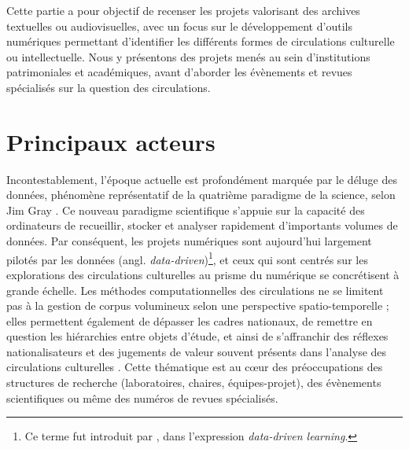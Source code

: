 \label{sect:sota_circulations}
Cette partie a pour objectif de recenser les projets valorisant des archives textuelles ou audiovisuelles,  avec un focus sur le développement d'outils numériques permettant d'identifier les différents formes de circulations culturelle ou intellectuelle. Nous y présentons des projets menés au sein d'institutions patrimoniales et académiques, avant d'aborder les évènements et revues spécialisés sur la question des circulations.
\section{Principaux acteurs}
\label{sect:sota_acteurs} Incontestablement, l'époque actuelle est profondément marquée par le \og{}déluge des données\fg{}, phénomène représentatif de la quatrième paradigme de la science, selon Jim Gray \citep[p.~30]{hey2009jim}. Ce nouveau paradigme scientifique s'appuie sur la capacité des ordinateurs de recueillir, stocker et analyser rapidement d'importants volumes de données. Par conséquent, les projets numériques sont aujourd'hui largement \og{}pilotés par les données (angl. \textit{data-driven})\fg{}\footnote{Ce terme fut introduit par \citet{Johns1991ShouldYB}, dans l'expression \textit{data-driven learning}.}, et ceux qui sont centrés sur les explorations des circulations culturelles au prisme du numérique se concrétisent à grande échelle. Les méthodes computationnelles des circulations ne se limitent pas à la gestion de corpus volumineux selon une perspective spatio-temporelle ; elles permettent également de dépasser les cadres nationaux, de remettre en question les hiérarchies entre objets d’étude, et ainsi de s'affranchir des \og{}réflexes nationalisateurs\fg{} et des \og{}jugements de valeur\fg{} souvent présents dans l'analyse des circulations culturelles \citep[p.~12]{joyeux2022circulations}.
Cette thématique est au c\oe{}ur des préoccupations des structures de recherche (laboratoires, chaires, équipes-projet), des évènements scientifiques ou même des numéros de revues spécialisés.

